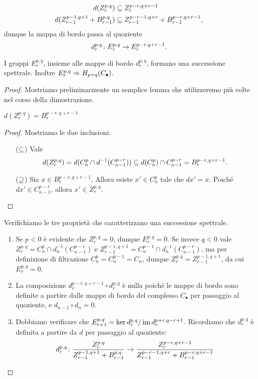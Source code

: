 \begin{align*}
d(Z^{p,q}_r)&\subseteq Z^{p-r,q+r-1}_r\\
d(Z^{p-1,q+1}_{r-1}+B^{p,q}_{r-1})&\subseteq Z^{p-r-1,q+r}_{r-1}+B^{p-r,q+r-1}_{r-1},
\end{align*}
dunque la mappa di bordo passa al quoziente
$$
d^{p,q}_r\colon E^{p,q}_r\to E^{p-r,q+r-1}_r.
$$
\begin{proposition}
I gruppi $E^{p,q}_r$, insieme alle mappe di bordo $d^{p,q}_r$, formano una successione spettrale. Inoltre $E^{p,q}_r\Rightarrow H_{p+q}(C_\bullet)$.
\end{proposition}
\begin{proof}
Mostriamo preliminarmente un semplice lemma che utilizzeremo più volte nel corso della dimostrazione.
\begin{lemma*}
$d(Z^{p,q}_r)=B^{p-r,q+r-1}_r$
\end{lemma*}
\begin{proof}
Mostriamo le due inclusioni.
\begin{itemize}
\item[($\subseteq$)] Vale
$$
d(Z^{p,q}_r)=d(C^p_n\cap d^{-1}(C^{p-r}_{n-1}))\subseteq d(C^p_n)\cap C^{p-r}_{n-1}=B^{p-r,q+r-1}_r.
$$
\item[($\supseteq$)] Sia $x\in B^{p-r,q+r-1}_r$. Allora esiste $x'\in C^p_n$ tale che $dx'=x$. Poiché $dx'\in C^{p-r}_{n-1}$, allora $x'\in Z^{p,q}_r$.
\end{itemize}
\end{proof}
Verifichiamo le tre proprietà che caratterizzano una successione spettrale.
\begin{enumerate}
\item Se $p<0$ è evidente che $Z^{p,q}_r=0$, dunque $E^{p,q}_r=0$. Se invece $q<0$ vale $Z^{p,q}_r=C^p_n\cap d_n^{-1}(C^{p-r}_{n-1})$ e $Z^{p-1,q+1}_{r-1}=C^{p-1}_n\cap d_n^{-1}(C^{p-r}_{n-1})$, ma per definizione di filtrazione $C^p_n=C^{p-1}_n=C_n$, dunque $Z^{p,q}_r=Z^{p-1,q+1}_{r-1}$, da cui $E^{p,q}_r=0$.
\item La composizione $d^{p-r,q+r-1}_r\circ d^{p,q}_r$ è nulla poiché le mappe di bordo sono definite a partire dalle mappe di bordo del complesso $C_\bullet$ per passaggio al quoziente, e $d_{n-1}\circ d_n=0$.
\item Dobbiamo verificare che $E^{p,q}_{r+1}=\ker d^{p,q}_r/\operatorname{im} d^{p+r,q-r+1}_r$. Ricordiamo che $d^{p,q}_r$ è definita a partire da $d$ per passaggio al quoziente:
$$
d^{p,q}_r\colon\frac{Z^{p,q}_r}{Z^{p-1,q+1}_{r-1}+B^{p,q}_{r-1}}\to\frac{Z^{p-r,q+r-1}_r}{Z^{p-r-1,q+r}_{r-1}+B^{p-r,q+r-1}_{r-1}}
$$
\end{enumerate}
\end{proof}
